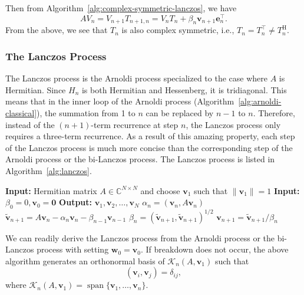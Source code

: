 {Then from Algorithm~\ref{alg:complex-symmetric-lanczos}, we have}
\begin{equation}\label{eq:complex-lanczos-matrix-relation}
AV_n=V_{n+1}T_{n+1,n}=V_nT_n+\beta_n\bm v_{n+1}\bm e_n^\top.
\end{equation}
{From the above, we see that $T_n$ is also complex symmetric, i.e., $T_n=T_n^\top\ne T_n^{\mathrm H}$.}
\subsubsection{{The Lanczos Process}}\label{subsec:lanczos-process}
{The Lanczos process is the Arnoldi process specialized to the case where $A$ is Hermitian. Since $H_n$ is both Hermitian and Hessenberg, it is tridiagonal. This means that in the inner loop of the Arnoldi process (Algorithm~\ref{alg:arnoldi-classical}), the summation from 1 to $n$ can be replaced by $n-1$ to $n$. Therefore, instead of the $(n+1)$-term recurrence at step $n$, the Lanczos process only requires a three-term recurrence. As a result of this amazing property, each step of the Lanczos process is much more concise than the corresponding step of the Arnoldi process or the bi-Lanczos process. The Lanczos process is listed in Algorithm~\ref{alg:lanczos}.}
\begin{algorithm}[H]\caption{{The Lanczos process}}\label{alg:lanczos}
\begin{algorithmic}[1]
\Statex\textbf{Input:} {Hermitian matrix $A\in\mathbb C^{N\times N}$ and choose $\bm v_1$ such that $\|\bm v_1\|=1$}
\Statex\textbf{Input:} $\beta_0=0,\bm v_0=\bm0$
\Statex\textbf{Output:} $\bm v_1,\bm v_2,\ldots,\bm v_N$
\State $\alpha_n=(\bm v_n,A\bm v_n)$
\State $\tilde{\bm v}_{n+1}=A\bm v_n-\alpha_n\bm v_n-\beta_{n-1}\bm v_{n-1}$
\State $\beta_n=(\tilde{\bm v}_{n+1},\tilde{\bm v}_{n+1})^{1/2}$
\State $\bm v_{n+1}=\tilde{\bm v}_{n+1}/\beta_n$
\EndFor
\end{algorithmic}\end{algorithm}
{We can readily derive the Lanczos process from the Arnoldi process or the bi-Lanczos process with setting $\bm w_0=\bm v_0$. If breakdown does not occur, the above algorithm generates an orthonormal basis of $\mathcal K_n(A,\bm v_1)$ such that}
\[(\bm v_i,\bm v_j)=\delta_{ij},\]
{where $\mathcal K_n(A,\bm v_1)=\operatorname{span}\{\bm v_1,\ldots,\bm v_n\}$.}
